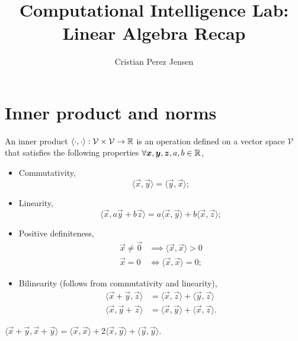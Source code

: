 \documentclass[justified,nobib]{tufte-handout}
\title{Computational Intelligence Lab: Linear Algebra Recap}
\author{Cristian Perez Jensen}
\newcommand{\ang}[1]{\langle #1 \rangle}
\begin{document}
\maketitle
\newpage
{}
\tableofcontents
{}
\newpage

\newpage\cleardoublepage{}

\section{Inner product and norms}

\begin{definition}
    An inner product $\ang{\cdot,\cdot}: \mathcal{V} \times \mathcal{V} \to \R$ is an operation
    defined on a vector space $\mathcal{V}$ that satisfies the following properties $\forall \bm{x},\bm{y},\bm{z},a,b\in \mathbb{R}$,
    \begin{itemize}
        \item Commutativity, \[
                  \ang{\vec{x},\vec{y}} = \ang{\vec{y},\vec{x}};
              \]
        \item Linearity, \[
                  \ang{\vec{x},a \vec{y} + b \vec{z}} = a \ang{\vec{x},\vec{y}} + b\ang{\vec{x},\vec{z}};
              \]
        \item Positive definiteness,
              \begin{align*}
                  \vec{x} \neq \vec{0} & \implies \ang{\vec{x},\vec{x}} > 0 \\
                  \vec{x} = 0          & \iff \ang{\vec{x},\vec{x}} = 0;
              \end{align*}
        \item Bilinearity (follows from commutativity and linearity),
              \begin{align*}
                  \ang{\vec{x} + \vec{y}, \vec{z}} & = \ang{\vec{x},\vec{z}} + \ang{\vec{y},\vec{z}}  \\
                  \ang{\vec{x},\vec{y} + \vec{z}}  & = \ang{\vec{x},\vec{y}} + \ang{\vec{x},\vec{z}}.
              \end{align*}
    \end{itemize}
\end{definition}

\begin{corollary}
    $\ang{\vec{x}+\vec{y},\vec{x}+\vec{y}} = \ang{\vec{x},\vec{x}} + 2\ang{\vec{x},\vec{y}} + \ang{\vec{y},\vec{y}}$.
\end{corollary}
\end{document}
